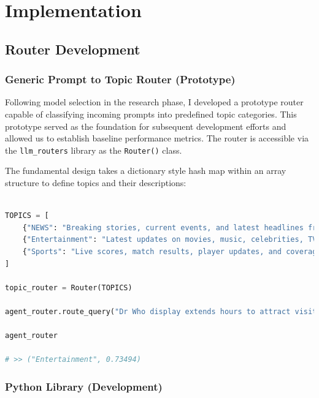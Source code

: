 \chapter{Implementation}
\label{ch:implementation}

\section{Router Development}

\subsection{Generic Prompt to Topic Router (Prototype)}
\label{sec:generic_router_dev}

Following model selection in the research phase, I developed a prototype router capable of classifying incoming prompts into predefined topic categories. This prototype served as the foundation for subsequent development efforts and allowed us to establish baseline performance metrics. The router is accessible via the \texttt{llm\_routers} library as the \texttt{Router()} class.

The fundamental design takes a dictionary style hash map within an array structure to define topics and their descriptions:

\begin{lstlisting}[language=Python, caption={Example Router Usage}, breaklines=true]

TOPICS = [
    {"NEWS": "Breaking stories, current events, and latest headlines from around the world, updated in real time."},
    {"Entertainment": "Latest updates on movies, music, celebrities, TV shows, and pop culture highlights."},
    {"Sports": "Live scores, match results, player updates, and coverage of major sporting events worldwide."}
]

topic_router = Router(TOPICS)

agent_router.route_query("Dr Who display extends hours to attract visitors")

agent_router

# >> ("Entertainment", 0.73494)
\end{lstlisting}





\subsection{Python Library
(Development)}\label{python library development}

